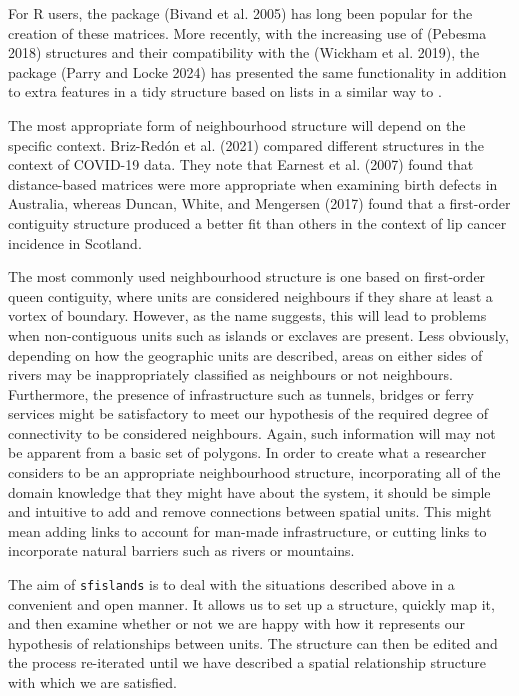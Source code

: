 For R users, the  package (Bivand et al. 2005) has long been popular for the
creation of these matrices. More recently, with the increasing use of  (Pebesma 2018)
structures and their compatibility with the  (Wickham et al. 2019), the  package (Parry and Locke 2024) has presented the same
functionality in addition to extra features in a tidy structure based on
lists in a similar way to .

The most appropriate form of neighbourhood structure will depend on the specific context. Briz-Redón et al. (2021) compared different structures in the context of COVID-19 data. They note that Earnest et al. (2007) found that distance-based matrices were more appropriate when examining birth defects in Australia, whereas Duncan, White, and Mengersen (2017) found that a first-order contiguity structure produced a better fit than others in the context of lip cancer incidence in Scotland.

The most commonly used neighbourhood structure is one based on first-order queen contiguity, where units are considered neighbours if they
share at least a vortex of boundary. However, as the name suggests, this
will lead to problems when non-contiguous units such as islands or
exclaves are present. Less obviously, depending on how the geographic
units are described, areas on either sides of rivers may be
inappropriately classified as neighbours or not neighbours. Furthermore,
the presence of infrastructure such as tunnels, bridges or ferry
services might be satisfactory to meet our hypothesis of the required
degree of connectivity to be considered neighbours. Again, such information will may not be apparent from a basic set of polygons. In order to create what a researcher considers to be an appropriate neighbourhood structure, incorporating all of the domain knowledge that they might have about the system, it should be simple and intuitive to add and remove connections between spatial units. This might mean adding links to account for man-made infrastructure, or cutting links to incorporate natural barriers such as rivers or mountains.

The aim of \texttt{sfislands} is to deal with the situations described above in a
convenient and open manner. It allows us to set up a structure, quickly
map it, and then examine whether or not we are happy with how it represents our hypothesis of relationships between units. The structure can then be edited and the process re-iterated until we have described a
spatial relationship structure with which we are satisfied.

